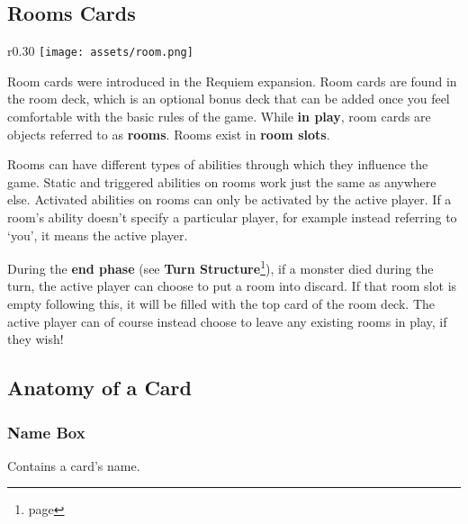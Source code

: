 \documentclass[10pt, a4paper, twoside]{article} %
\begin{document}
    \subsection{Rooms Cards}
    \begin{wrapfigure}{r}{0.30\textwidth}
        \centering
        \texttt{[image: assets/room.png]}
    \end{wrapfigure}
    Room cards were introduced in the Requiem expansion. Room cards are found in the room deck, which is an optional bonus deck that can be added once you feel comfortable with the basic rules of the game. While \textbf{in play}, room cards are objects referred to as \textbf{rooms}. Rooms exist in \textbf{room slots}.

    Rooms can have different types of abilities through which they influence the game. Static and triggered abilities on rooms work just the same as anywhere else. Activated abilities on rooms can only be activated by the active player. If a room’s ability doesn’t specify a particular player, for example instead referring to ‘you’, it means the active player.

    During the \textbf{end phase} (see \textbf{Turn Structure}\footnote{page \pageref{turn}}), if a monster died during the turn, the active player can choose to put a room into discard. If that room slot is empty following this, it will be filled with the top card of the room deck. The active player can of course instead choose to leave any existing rooms in play, if they wish!

    \subsection{Anatomy of a Card}
    \subsubsection*{Name Box} Contains a card’s name.
\end{document}
